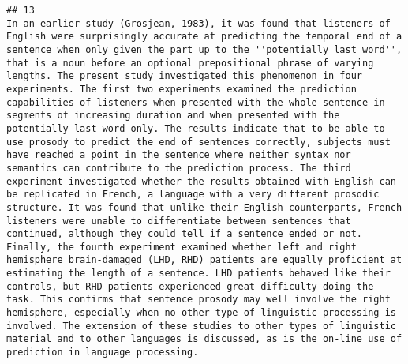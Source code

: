 \documentclass[
  english,
  man]{apa6}
\begin{document}
\begin{verbatim}
## 13                                                                                                                                                                                                                                                                                                                                                                                                                                                                                                                                                                                                                                                                                                                                                                                                                                                                                            In an earlier study (Grosjean, 1983), it was found that listeners of English were surprisingly accurate at predicting the temporal end of a sentence when only given the part up to the ''potentially last word'', that is a noun before an optional prepositional phrase of varying lengths. The present study investigated this phenomenon in four experiments. The first two experiments examined the prediction capabilities of listeners when presented with the whole sentence in segments of increasing duration and when presented with the potentially last word only. The results indicate that to be able to use prosody to predict the end of sentences correctly, subjects must have reached a point in the sentence where neither syntax nor semantics can contribute to the prediction process. The third experiment investigated whether the results obtained with English can be replicated in French, a language with a very different prosodic structure. It was found that unlike their English counterparts, French listeners were unable to differentiate between sentences that continued, although they could tell if a sentence ended or not. Finally, the fourth experiment examined whether left and right hemisphere brain-damaged (LHD, RHD) patients are equally proficient at estimating the length of a sentence. LHD patients behaved like their controls, but RHD patients experienced great difficulty doing the task. This confirms that sentence prosody may well involve the right hemisphere, especially when no other type of linguistic processing is involved. The extension of these studies to other types of linguistic material and to other languages is discussed, as is the on-line use of prediction in language processing.

\end{verbatim}
\end{document}
